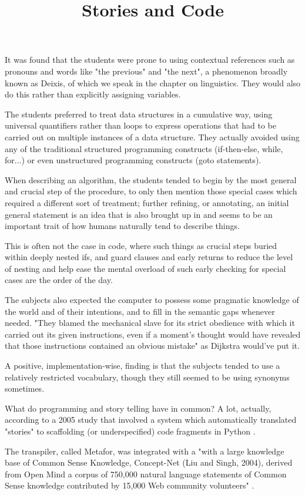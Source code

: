It was found that the students were prone to using contextual references such as pronouns and words like "the previous" and "the next", a phenomenon broadly known as Deixis, of which we speak in the chapter on linguistics. They would also do this rather than explicitly assigning variables.

The students preferred to treat data structures in a cumulative way, using universal quantifiers rather than loops to express operations that had to be carried out on multiple instances of a data structure. They actually avoided using any of the traditional structured programming constructs (if-then-else, while, for...) or even unstructured programming constructs (goto statements).

When describing an algorithm, the students tended to begin by the most general and crucial step of the procedure, to only then mention those special cases which required a different sort of treatment; further refining, or annotating, an initial general statement is an idea that is also brought up in \cite{brachman2022machines} and seems to be an important trait of how humans naturally tend to describe things.

This is often not the case in code, where such things as crucial steps buried within deeply nested ifs, and guard clauses and early returns to reduce the level of nesting and help ease the mental overload of such early checking for special cases are the order of the day.

The subjects also expected the computer to possess some pragmatic knowledge of the world and of their intentions, and to fill in the semantic gaps whenever needed. "They blamed the mechanical slave for its strict obedience with which it carried out its given instructions, even if a moment's thought would have revealed that those instructions contained an obvious mistake" \cite{foolishnessnatprogramming} as Dijkstra would've put it.

A positive, implementation-wise, finding is that the subjects tended to use a relatively restricted vocabulary, though they still seemed to be using synonyms sometimes.

\title{Stories and Code}

What do programming and story telling have in common? A lot, actually, according to a 2005 study that involved a system which automatically translated "stories" to scaffolding (or underspecified) code fragments in Python \cite{liu2005metafor, liu2005programmatic}.

The transpiler, called Metafor, was integrated with a "with a large knowledge base of Common Sense Knowledge, Concept-Net (Liu and Singh, 2004), derived from Open Mind a corpus of 750,000 natural language statements of Common Sense knowledge contributed by 15,000 Web community volunteers" \cite{liu2005metafor}.

